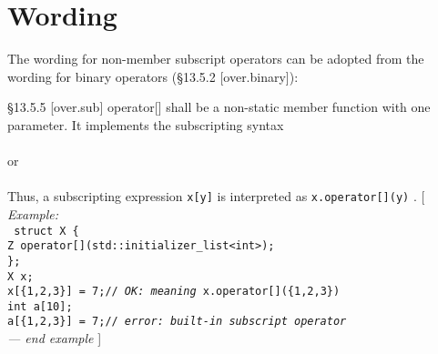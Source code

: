 \section{Wording}

The wording for non\hyp member subscript operators can be adopted from the wording for binary operators (§13.5.2 [over.binary]):

\begin{wgText}{§13.5.5 [over.sub]}
  operator[] shall be a non-static member function with one parameter.
  It implements the subscripting syntax\\
  \hspace*{4em}\\
  \hspace*{2em}or\\
  \hspace*{4em}\\

  Thus, a subscripting expression \texttt{x[y]} is interpreted as
  \texttt{x.operator[](y)} .
  [ \textit{Example:}\\
    \texttt{
      \settowidth{\myIndent}{X}%
      struct X \{\\
      \hspace*{2\myIndent}Z operator[](std::initializer\_list<int>);\\
      \};\\
      X x;\\
      x[\{1,2,3\}] = 7;\hspace*{7\myIndent}// \textrm{\itshape OK: meaning} x.operator[](\{1,2,3\})\\
      int a[10];\\
      a[\{1,2,3\}] = 7;\hspace*{7\myIndent}// \textrm{\itshape error: built-in subscript operator}\\
    }
  \textit{— end example} ]
\end{wgText}

